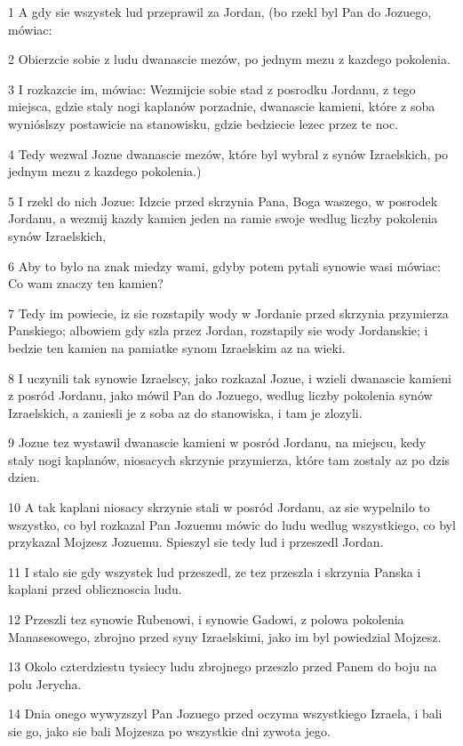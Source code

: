 \par 1 A gdy sie wszystek lud przeprawil za Jordan, (bo rzekl byl Pan do Jozuego, mówiac:
\par 2 Obierzcie sobie z ludu dwanascie mezów, po jednym mezu z kazdego pokolenia.
\par 3 I rozkazcie im, mówiac: Wezmijcie sobie stad z posrodku Jordanu, z tego miejsca, gdzie staly nogi kaplanów porzadnie, dwanascie kamieni, które z soba wynióslszy postawicie na stanowisku, gdzie bedziecie lezec przez te noc.
\par 4 Tedy wezwal Jozue dwanascie mezów, które byl wybral z synów Izraelskich, po jednym mezu z kazdego pokolenia.)
\par 5 I rzekl do nich Jozue: Idzcie przed skrzynia Pana, Boga waszego, w posrodek Jordanu, a wezmij kazdy kamien jeden na ramie swoje wedlug liczby pokolenia synów Izraelskich,
\par 6 Aby to bylo na znak miedzy wami, gdyby potem pytali synowie wasi mówiac: Co wam znaczy ten kamien?
\par 7 Tedy im powiecie, iz sie rozstapily wody w Jordanie przed skrzynia przymierza Panskiego; albowiem gdy szla przez Jordan, rozstapily sie wody Jordanskie; i bedzie ten kamien na pamiatke synom Izraelskim az na wieki.
\par 8 I uczynili tak synowie Izraelscy, jako rozkazal Jozue, i wzieli dwanascie kamieni z posród Jordanu, jako mówil Pan do Jozuego, wedlug liczby pokolenia synów Izraelskich, a zaniesli je z soba az do stanowiska, i tam je zlozyli.
\par 9 Jozue tez wystawil dwanascie kamieni w posród Jordanu, na miejscu, kedy staly nogi kaplanów, niosacych skrzynie przymierza, które tam zostaly az po dzis dzien.
\par 10 A tak kaplani niosacy skrzynie stali w posród Jordanu, az sie wypelnilo to wszystko, co byl rozkazal Pan Jozuemu mówic do ludu wedlug wszystkiego, co byl przykazal Mojzesz Jozuemu. Spieszyl sie tedy lud i przeszedl Jordan.
\par 11 I stalo sie gdy wszystek lud przeszedl, ze tez przeszla i skrzynia Panska i kaplani przed oblicznoscia ludu.
\par 12 Przeszli tez synowie Rubenowi, i synowie Gadowi, z polowa pokolenia Manasesowego, zbrojno przed syny Izraelskimi, jako im byl powiedzial Mojzesz.
\par 13 Okolo czterdziestu tysiecy ludu zbrojnego przeszlo przed Panem do boju na polu Jerycha.
\par 14 Dnia onego wywyzszyl Pan Jozuego przed oczyma wszystkiego Izraela, i bali sie go, jako sie bali Mojzesza po wszystkie dni zywota jego.

